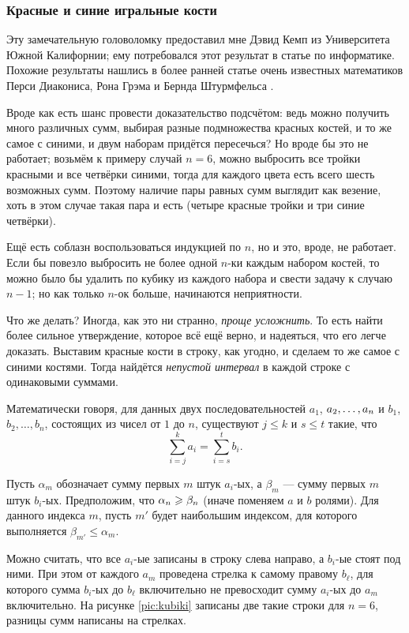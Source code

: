 \subsubsection*{Красные и синие игральные кости}

Эту замечательную головоломку предоставил мне Дэвид Кемп из Университета Южной Калифорнии; ему потребовался этот результат в статье по информатике.
Похожие результаты нашлись в более ранней статье очень известных математиков Перси Диакониса, Рона Грэма и Бернда Штурмфельса \cite{14}.

Вроде как есть шанс провести доказательство подсчётом: ведь можно получить много различных сумм, выбирая разные подмножества красных костей, и то же самое с синими, и двум наборам придётся пересечься?
Но вроде бы это не работает;
возьмём к примеру случай $n = 6$,  можно выбросить все тройки красными и все четвёрки синими, тогда для каждого цвета есть всего шесть возможных сумм.
Поэтому наличие пары равных сумм выглядит как везение,
хоть в этом случае такая пара и есть (четыре красные тройки и три синие четвёрки).

Ещё есть соблазн воспользоваться индукцией по $n$, но и это, вроде, не работает.
Если бы повезло выбросить не более одной $n$-ки каждым набором костей,
то можно было бы удалить по кубику из каждого набора и свести задачу к случаю $n-1$;
но как только $n$-ок больше, начинаются неприятности.

Что же делать?
Иногда, как это ни странно, \emph{проще усложнить}.
То есть найти более сильное утверждение, которое всё ещё верно, и надеяться, что его легче доказать.
Выставим красные кости в строку, как угодно, и сделаем то же самое с синими костями.
Тогда найдётся \emph{непустой интервал} в каждой строке с одинаковыми суммами.

Математически говоря, для данных двух последовательностей  $a_1$, $a_2,\z\dots,a_n$ и $b_1$, $b_2,\dots,b_n$, состоящих из чисел от $1$ до $n$, существуют 
$j\le k$ и 
$s\le t$ такие, что 
\[\sum_{i=j}^ka_i=\sum_{i=s}^tb_i.\]

Пусть $\alpha_m$ обозначает сумму первых $m$ штук $a_i$-ых,
а $\beta_m$ --- сумму первых $m$ штук $b_i$-ых.
Предположим, что $\alpha_n\z\ge \beta_n$ (иначе поменяем $a$ и $b$ ролями).
Для данного индекса $m$, пусть $m'$ будет наибольшим индексом, для которого выполняется $\beta_{m'}\le \alpha_m$.

Можно считать, что все $a_i$-ые записаны в строку слева направо, а $b_i$-ые стоят под ними.
При этом от каждого $a_m$ проведена стрелка к самому правому $b_\ell$, для которого сумма $b_i$-ых до $b_\ell$ включительно не превосходит сумму $a_i$-ых до $a_m$ включительно.
На рисунке \ref{pic:kubiki} записаны две такие строки для $n=6$,
разницы сумм написаны на стрелках.


